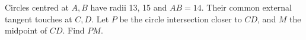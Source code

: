 Circles centred at $ A,B $ have radii 13, 15 and $ AB=14 $. Their common external tangent touches at $ C,D $. Let $ P $ be the circle intersection closer to $ CD $, and $ M $ the midpoint of $ CD $. Find $ PM $.
